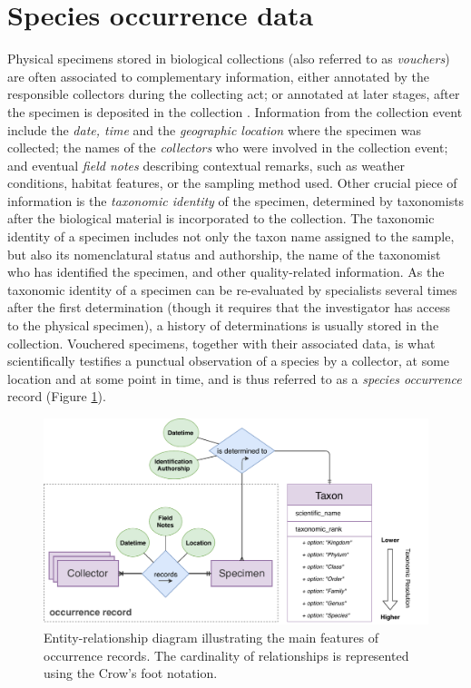 \section{Species occurrence data} \label{section:occurrence_data}
Physical specimens stored in biological collections (also referred to as \textit{vouchers}) are often associated to complementary information, either annotated by the responsible collectors during the collecting act; or annotated at later stages, after the specimen is deposited in the collection \cite{Chapman2005}.
Information from the collection event include the \textit{date, time} and the \textit{geographic location} where the specimen was collected; the names of the \textit{collectors} who were involved in the collection event; and eventual \textit{field notes} describing contextual remarks, such as weather conditions, habitat features, or the sampling method used.
Other crucial piece of information is the \textit{taxonomic identity} of the specimen, determined by taxonomists after the biological material is incorporated to the collection.
%
The taxonomic identity of a specimen includes not only the taxon name assigned to the sample, but also its nomenclatural status and authorship, the name of the taxonomist who has identified the specimen, and other quality-related information.
As the taxonomic identity of a specimen can be re-evaluated by specialists several times after the first determination (though it requires that the investigator has access to the physical specimen), a history of determinations is usually stored in the collection.
%
Vouchered specimens, together with their associated data, is what scientifically testifies a punctual observation of a species by a collector, at some location and at some point in time, and is thus referred to as a \textit{species occurrence} record (Figure \ref{fig:occurrences_er}).

\begin{figure}[h!]
  	\centering
    \includegraphics[width=\linewidth]{figures/collections_data/occurrences_er.pdf}
    \caption[Entity-relationship diagram illustrating the main features of occurrence records]{Entity-relationship diagram illustrating the main features of occurrence records. The cardinality of relationships is represented using the Crow's foot notation.}
    \label{fig:occurrences_er}
\end{figure}

